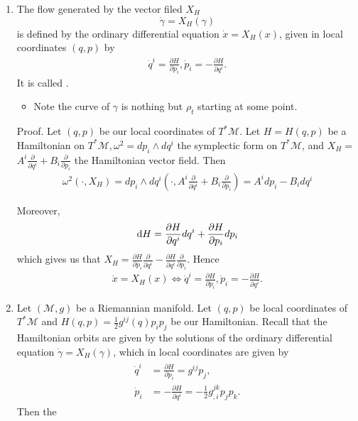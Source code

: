 \documentclass{article}
\begin{document}
\begin{enumerate}
\item {} The flow generated by the vector filed $X_H$ 
$$\dot{\gamma}=X_H(\gamma)$$
is defined by the ordinary differential equation $\dot{x}=X_H(x)$, given in local coordinates $(q, p)$ by
\begin{align*}
\dot{q}^i=\frac{\partial H}{\partial p_i}, \dot{p}_i=-\frac{\partial H}{\partial q^i} .
\end{align*}
It is called .
\begin{itemize}
    \item Note the curve of $\gamma$ is nothing but $\rho_t$ starting at some point.
\end{itemize}

{\tiny Proof. Let $(q, p)$ be our local coordinates of $T^* \mathcal{M}$. Let $H=H(q, p)$ be a Hamiltonian on $T^* \mathcal{M}, \omega^2=d p_i \wedge d q^i$ the symplectic form on $T^* \mathcal{M}$, and $X_H=$ $A^i \frac{\partial}{\partial q^i}+B_i \frac{\partial}{\partial p_i}$ the Hamiltonian vector field. Then
\begin{align*}
\omega^2\left(\cdot, X_H\right)=d p_i \wedge d q^i\left(\cdot, A^i \frac{\partial}{\partial q^i}+B_i \frac{\partial}{\partial p_i}\right)=A^i d p_i-B_i d q^i
\end{align*}

Moreover,
\begin{align*}
\mathrm{d} H=\frac{\partial H}{\partial q^i} d q^i+\frac{\partial H}{\partial p_i} d p_i
\end{align*}
which gives us that $X_H=\frac{\partial H}{\partial p_i} \frac{\partial}{\partial q^i}-\frac{\partial H}{\partial q^i} \frac{\partial}{\partial p_i}$. Hence
\begin{align*}
\dot{x}=X_H(x) \Longleftrightarrow \dot{q}^i=\frac{\partial H}{\partial p_i}, \dot{p}_i=-\frac{\partial H}{\partial q^i} .
\end{align*}

}

\item {} Let $(\mathcal{M}, g)$ be a Riemannian manifold. Let $(q, p)$ be local coordinates of $T^* \mathcal{M}$ and $H(q, p)=\frac{1}{2} g^{i j}(q) p_i p_j$ be our Hamiltonian.  Recall that the Hamiltonian orbits are given by the solutions of the ordinary differential equation $\dot{\gamma}=X_H(\gamma)$, which in local coordinates are given by
\begin{align*}
\begin{aligned}
\dot{q}^i &=\frac{\partial H}{\partial p_i}=g^{i j} p_j, \\
\dot{p}_i &=-\frac{\partial H}{\partial q^i}=-\frac{1}{2} g_{, i}^{j k} p_j p_k .
\end{aligned}
\end{align*}
Then the 


\end{enumerate}
\end{document}
